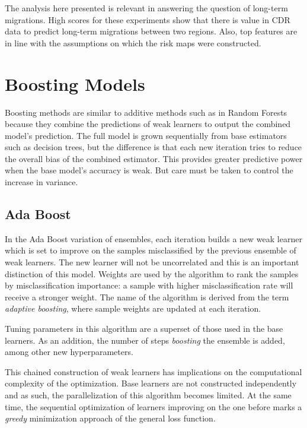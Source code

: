 The analysis here presented is relevant in answering the question of long-term migrations.
High scores for these experiments show that there is value in CDR data to predict long-term migrations between two regions.
Also, top features are in line with the assumptions on which the risk maps were constructed.



\section{Boosting Models}\label{section:gradient_boosting}

Boosting methods are similar to additive methods such as in Random Forests because they combine the predictions of weak learners to output the combined model's prediction.
The full model is grown sequentially from base estimators such as decision trees, but the difference is that each new iteration tries to reduce the overall bias of the combined estimator.
This provides greater predictive power when the base model's accuracy is weak.
But care must be taken to control the increase in variance.

\subsection{Ada Boost}

In the Ada Boost variation of ensembles, each iteration builds a new weak learner which is set to improve on the samples misclassified by the previous ensemble of weak learners.
The new learner will not be uncorrelated and this is an important distinction of this model.
Weights are used by the algorithm to rank the samples by misclassification importance: a sample with higher misclassification rate will receive a stronger weight.
The name of the algorithm is derived from the term \textit{adaptive boosting}, where sample weights are updated at each iteration.

Tuning parameters in this algorithm are a superset of those used in the base learners.
As an addition, the number of steps \textit{boosting} the ensemble is added, among other new hyperparameters.

This chained construction of weak learners has implications on the computational complexity of the optimization.
Base learners are not constructed independently and as such, the parallelization of this algorithm becomes limited.
At the same time, the sequential optimization of learners improving on the one before marks a \textit{greedy} minimization approach of the general loss function.

